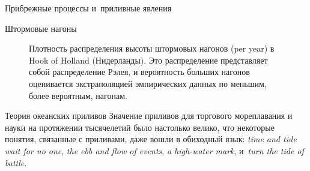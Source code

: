 \begin{chapter}{Прибрежные процессы и~приливные явления}
\begin{section}{Штормовые нагоны}
\begin{figure}[t!]
\caption{Плотность распределения высоты штормовых нагонов (per year)
в Hook of Holland (Нидерланды). Это распределение представляет собой
распределение Рэлея, и вероятность больших нагонов оценивается экстраполяцией
эмпирических данных по меньшим, более вероятным, нагонам.~\cite[стр.~113]{Wiegel:1964}}
\label{fig:surgeprob}
\end{figure}
%
\end{section}

\begin{section}{Теория океанских приливов}
Значение приливов для торгового мореплавания и науки
на протяжении тысячелетий было настолько велико, что некоторые понятия,
связанные с приливами, даже вошли в обиходный язык:
\textit{time and tide wait for no one}, 
\textit{the ebb and flow of events}, 
\textit{a high-water mark}, 
и~\textit{turn the tide of battle}.
%


\end{section}
\end{chapter}
